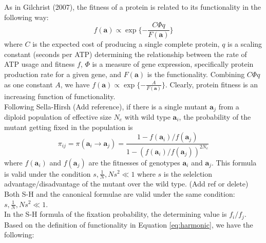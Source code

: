 \documentclass[13pt]{article}
\begin{document}
As in Gilchrist (2007), the fitness of a protein is related to its functionality in the following way:
\[f(\mathbf{a}) \propto \exp\{-\frac{C\Phi q}{F(\mathbf{a})}\}\]
where $C$ is the expected cost of producing a single complete protein, $q$ is a scaling constant (seconds per ATP) determining the relationship between the rate of ATP usage and fitness $f$, $\Phi$ is a measure of gene expression, specifically protein production rate for a given gene, and $F(\mathbf{a})$ is the functionality.
Combining $C\Phi q$ as one constant $A$, we have
$f(\mathbf{a}) \propto \exp\{-\frac{A}{F(\mathbf{a})}\}$.
Clearly, protein fitness is an increasing function of functionality.\\

Following Sella-Hirsh (Add reference), if there is a single mutant $\mathbf{a}_j$ from a diploid population of effective size $N_e$ with wild type $\mathbf{a}_i$, the probability of the mutant getting fixed in the population is 
\begin{equation}
\pi_{ij} = \pi(\mathbf{a}_i \to \mathbf{a}_j ) = \frac{1-f(\mathbf{a}_i)/f(\mathbf{a}_j)}{1-(f(\mathbf{a}_i)/f(\mathbf{a}_j))^{2N_e}}
\label{eq:fixation}
\end{equation}
where $f(\mathbf{a}_i)$ and $f(\mathbf{a}_j)$ are the fitnesses of genotypes $\mathbf{a}_i$ and $\mathbf{a}_j$.
This formula is valid under the condition $s, \frac{1}{N}, Ns^2 \ll 1$ where $s$ is the selelction advantage/disadvantage of the mutant over the wild type. (Add ref or delete)\\

%
%
Both S-H and the canonical formulae are valid under the same condition: $s, \frac{1}{N}, Ns^2 \ll 1$.\\




In the S-H formula of the fixation probability, the determining value is $f_i/f_j$.
Based on the definition of functionality in Equation \ref{eq:harmonic}, we have the following:
\end{document}
